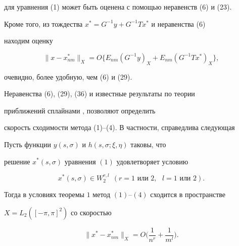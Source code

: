 для уравнения (1) может быть оценена с помощью неравенств (6) и (23). 


Кроме того, из тождества $x^*=G^{-1}y+G^{-1}T x^*$ и неравенства (6) 


находим оценку 


\begin{equation} 


\|x-x^*_{nm}\|_X=O\{E_{nm}(G^{-1}y)_X+ 


E_{nm}(G^{-1}T x^*)_X\}, 


\end{equation} 


очевидно, более удобную, чем (6) и (29). 


 


Неравенства (6), (29), (36) и известные результаты по теории 


приближений сплайнами \cite{11}, \cite{12} позволяют определить 


скорость сходимости метода (1)--(4). В частности, справедлива следующая 


 


\begin{thm} 


Пусть функции $y(s,\sigma)$ и $h(s,\sigma;\xi,\eta)$ таковы, что 


решение $x^*(s,\sigma)$ уравнения $(1)$ удовлетворяет условию 


\begin{equation} 


x^*(s,\sigma)\in W^{r,l}_2\ \ 


(\text{$r=1$ или $2,$ $l=1$ или $2$}). 


\end{equation} 


Тогда в условиях теоремы $1$ метод $(1)$--$(4)$ сходится в пространстве 


$X=L_2([-\pi,\pi]^2)$ со скоростью 


\begin{equation} 


\|x^*-x^*_{nm}\|_X=O\bigg(\frac{1}{n^r}+\frac{1}{m^l} \bigg). 


\end{equation} 


\end{thm} 


 


